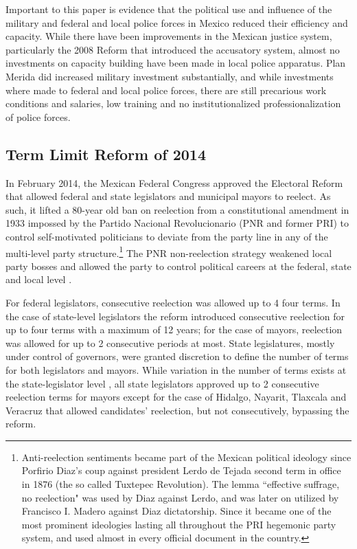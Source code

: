 Important to this paper is evidence that the political use and influence of the military \citep{aguayo_2001, moloeznik_2010, lopez_gonzalez_2012} and federal and local police forces in Mexico \citep{zepeda_2010, sabet_2012, lopez_portillo_2012, davis_2017} reduced their efficiency and capacity. While there have been improvements in the Mexican justice system, particularly the 2008 Reform that introduced the accusatory system, almost no investments on capacity building have been made in local police apparatus. Plan Merida did increased military investment substantially, and while investments where made to federal and local police forces, there are still precarious work conditions and salaries, low training and no institutionalized professionalization of police forces. 


\subsection{Term Limit Reform of 2014 \label{sec:reform}}   
       
In February 2014, the Mexican Federal Congress approved the Electoral Reform that allowed federal and state legislators and municipal mayors to reelect. As such, it lifted a 80-year old ban on reelection from a constitutional amendment in 1933 impossed by the Partido Nacional Revolucionario (PNR and former PRI) to control self-motivated politicians to deviate from the party line in any of the multi-level party structure.\footnote{Anti-reelection sentiments became part of the Mexican political ideology since Porfirio Diaz's coup against president Lerdo de Tejada second term in office in 1876 (the so called Tuxtepec Revolution). The lemma ``effective suffrage, no reelection" was used by Diaz against Lerdo, and was later on utilized by Francisco I. Madero against Diaz dictatorship. Since it became one of the most prominent ideologies lasting all throughout the PRI hegemonic party system, and used almost in every official document in the country.} The PNR non-reelection strategy weakened local party bosses and allowed the party to control political careers at the federal, state and local level \citep{weldon_2003}. 

For federal legislators, consecutive reelection was allowed up to 4 four terms. In the case of state-level legislators the reform introduced consecutive reelection for up to four terms with a maximum of 12 years; for the case of mayors, reelection was allowed for up to 2 consecutive periods at most. State legislatures, mostly under control of governors, were granted discretion to define the number of terms for both legislators and mayors. While variation in the number of terms exists at the state-legislator level \citep{motolinia_2020}, all state legislators approved up to 2 consecutive reelection terms for mayors except for the case of Hidalgo, Nayarit, Tlaxcala and Veracruz that allowed candidates' reelection, but not consecutively, bypassing the reform.  

